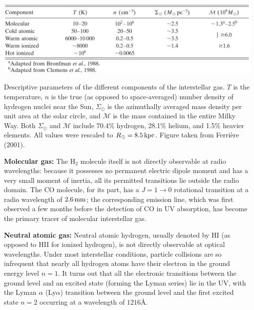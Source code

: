 \documentclass[a4paper,10pt]{article}
\begin{document}
\begin{table}[h]
    \centering
    \includegraphics[width=14cm]{figures/ISMphases_table.png}
    \caption{\footnotesize{Descriptive parameters of the different components of the interstellar gas. $T$ is the temperature, $n$ is the true (as opposed to space-averaged) number density of hydrogen nuclei near the Sun, $\Sigma_\odot$ is the azimuthally averaged mass density per unit area at the solar circle, and $\mathcal{M}$ is the mass contained in the entire Milky Way. Both $\Sigma_\odot$ and $\mathcal{M}$ include 70.4\% hydrogen, 28.1\% helium, and 1.5\% heavier elements. All values were rescaled to $R_\odot=8.5\,{\rm kpc}$. Figure taken from Ferri\`ere (2001).}}
    \label{table:ISMphases}
\end{table}

{\noindent}\textbf{Molecular gas:} The H$_2$ molecule itself is not directly observable at radio wavelengths: because it possesses no permanent electric dipole moment and has a very small moment of inertia, all its permitted transitions lie outside the radio domain. The CO molecule, for its part, has a $J=1\rightarrow0$ rotational transition at a radio wavelength of $2.6\,{\rm mm}$; the corresponding emission line, which was first observed a few months before the detection of CO in UV absorption, has become the primary tracer of molecular interstellar gas.

{\noindent}\textbf{Neutral atomic gas:} Neutral atomic hydrogen, usually denoted by HI (as opposed to HII for ionized hydrogen), is not directly observable at optical wavelengths. Under most interstellar conditions, particle collisions are so infrequent that nearly all hydrogen atoms have their electron in the ground energy level $n=1$. It turns out that all the electronic transitions between the ground level and an excited state (forming the Lyman series) lie in the UV, with the Lyman $\alpha$ (Ly$\alpha$) transition between the ground level and the first excited state $n=2$ occurring at a wavelength of $1216$\AA.
\end{document}
